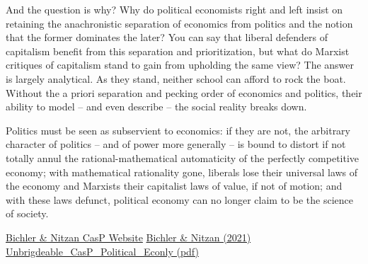 \documentclass[
]{book}
\begin{document}
And the question is why? Why do political economists right and left insist on retaining the
anachronistic separation of economics from politics and the notion that the former dominates
the later? You can say that liberal defenders of capitalism benefit from this separation and
prioritization, but what do Marxist critiques of capitalism stand to gain from upholding the
same view? The answer is largely analytical. As they stand, neither school can afford to rock
the boat. Without the a priori separation and pecking order of economics and politics, their
ability to model -- and even describe -- the social reality breaks down.

Politics must be seen as subservient to economics: if they are not, the
arbitrary character of politics -- and of power more generally -- is bound to distort if not totally
annul the rational-mathematical automaticity of the perfectly competitive economy; with
mathematical rationality gone, liberals lose their universal laws of the economy and Marxists
their capitalist laws of value, if not of motion; and with these laws defunct, political economy
can no longer claim to be the science of society.

\href{https://capitalaspower.com/}{Bichler \& Nitzan CasP Website}
\href{Bichler_Nitzan_2021_Unbridgeable_RWER95.pdf}{Bichler \& Nitzan (2021) Unbrigdeable\_CasP\_Political\_Econly (pdf)}
\end{document}
